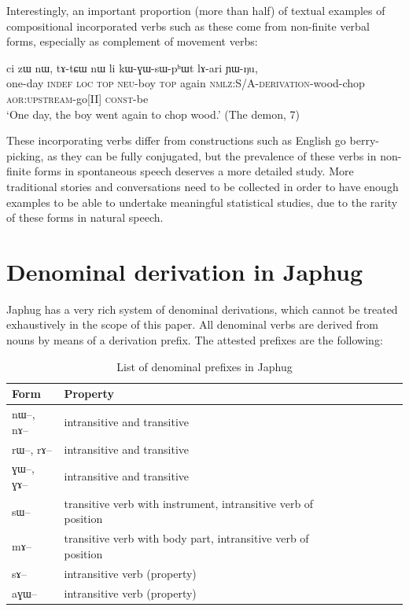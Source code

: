 \documentclass[oldfontcommands,oneside,a4paper,11pt]{article}
\newcommand{\ipa}[1]{{\phon #1}} %
\newcommand{\aor}{\textsc{aor}}
\newcommand{\const}{\textsc{const}}
\newcommand{\loc}{\textsc{loc}}
\newcommand{\neu}{\textsc{neu}}
\newcommand{\nmlz}{\textsc{nmlz}}
\newcommand{\topic}{\textsc{top}}
\begin{document}
Interestingly, an important proportion (more than half) of textual examples of compositional incorporated verbs such as these come from non-finite verbal forms, especially as complement of movement verbs: 
 \begin{exe}
\ex
\gll    	\ipa{tɯ-sŋi}	\ipa{ci} \ipa{zɯ}	\ipa{nɯ},	\ipa{tɤ-tɕɯ}	\ipa{nɯ}	\ipa{li}	\ipa{kɯ-ɣɯ-sɯ-pʰɯt}	\ipa{lɤ-ari}	\ipa{ɲɯ-ŋu}, \\
  one-day \textsc{indef} \loc{} \topic{} \neu{}-boy \topic{} again \nmlz{}:S/A-\textsc{derivation}-wood-chop \aor{}:\textsc{upstream}-go[II]  \const{}-be\\
 \glt `One day, the boy went again to chop wood.' (The demon, 7)
\end{exe} 
 
These incorporating  verbs differ from constructions such as English \ipa{go berry-picking}, as they can be fully conjugated, but the prevalence of these verbs in non-finite forms in spontaneous speech deserves a more detailed study. More traditional stories and conversations need to be collected in order to have enough examples to be able to undertake meaningful statistical studies, due to the rarity of these forms in natural speech.
 
\section{Denominal derivation in Japhug} \label{sec:denom}



Japhug has a very rich system of denominal derivations, which cannot be treated exhaustively in the scope of this paper. All denominal verbs are derived from nouns by means of a derivation prefix. The attested prefixes are the following:

\begin{table}[H] \centering
\caption{List of denominal prefixes in Japhug}\label{tab:denom.pref} 
\begin{tabular}{lllllllll} \toprule
Form& Property \\
\midrule
\ipa{nɯ}--, \ipa{nɤ}-- & intransitive and transitive \\
\ipa{rɯ}--, \ipa{rɤ}-- & intransitive and transitive \\
\ipa{ɣɯ}--, \ipa{ɣɤ}-- & intransitive and transitive \\
\ipa{sɯ}--  & transitive verb with instrument, intransitive verb of position \\
\ipa{mɤ}-- & transitive verb with body part, intransitive verb of position \\
\ipa{sɤ}-- & intransitive verb (property) \\
\ipa{aɣɯ}-- & intransitive verb (property) \\
    \bottomrule
\end{tabular}
\end{table}
\end{document}
